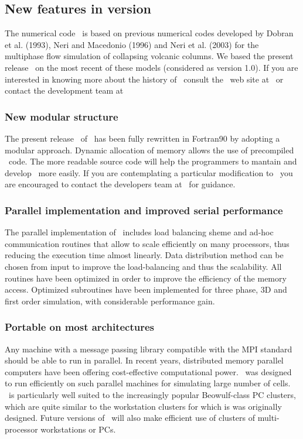 \subsection{New features in version \PDACVERSION}

The numerical code \PDAC\ is based on previous numerical codes developed
by Dobran et al. (1993), Neri and Macedonio (1996) and Neri et al. (2003)
for the multiphase flow simulation of collapsing volcanic columns. We based
the present release \PDACVERSION\ on the most recent of these models 
(considered as version 1.0). If you are interested in knowing more about
the history of \PDAC\, consult the \PDAC\ web site at 
\PDACURL\ or contact the development team at 
\PDACADDRESS\

\subsubsection*{New modular structure}
The present release \PDACVERSION\ of \PDAC\ has been fully rewritten in 
Fortran90 by adopting a modular approach. Dynamic allocation of memory
allows the use of precompiled \PDAC\ code. The more readable source code
will help the programmers to mantain and develop \PDAC\ more easily.
If you are contemplating a particular modification to \PDAC\
you are encouraged to contact the developers team at \PDACADDRESS\
for guidance.

\subsubsection*{Parallel implementation and improved serial performance}
The parallel implementation of \PDAC\ includes load balancing sheme 
and ad-hoc communication routines that allow \PDAC to scale efficiently 
on many processors, thus reducing the execution time almost linearly.
Data distribution method can be chosen from input to improve the 
load-balancing and thus the scalability. All routines have been 
optimized in order to improve the efficiency of the memory access.
Optimized subroutines have been implemented for three phase, 3D and
first order simulation, with considerable performance gain.

\subsubsection*{Portable on most architectures}
Any machine with a message passing library compatible with the MPI 
standard should be able to run \PDAC in parallel.
In recent years, distributed memory parallel computers have been offering
cost-effective computational power.  \PDAC\ was designed to run efficiently
on such parallel machines for simulating large number of cells. 
\PDAC\ is particularly well suited to the increasingly popular Beowulf-class PC 
clusters, which are quite similar to the workstation clusters for which is was 
originally designed.
Future versions of \PDAC\ will also make efficient use of clusters of 
multi-processor workstations or PCs.

